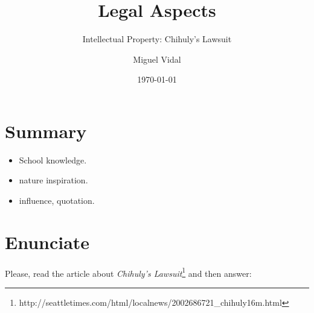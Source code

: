 \documentclass[11pt]{scrartcl}
\title{\textbf{Legal Aspects}}
\subtitle{Intellectual Property: Chihuly's Lawsuit}
\author{Miguel Vidal}
\date{\today}
\begin{document}
\maketitle

\section{Summary}

\begin{itemize}

	\item School knowledge.
	\item nature inspiration.
	\item influence, quotation.
\end{itemize}

\section{Enunciate}

Please, read the article about \emph{Chihuly's Lawsuit}\footnote{http://seattletimes.com/html/localnews/2002686721\_chihuly16m.html} and then answer:
\end{document}
